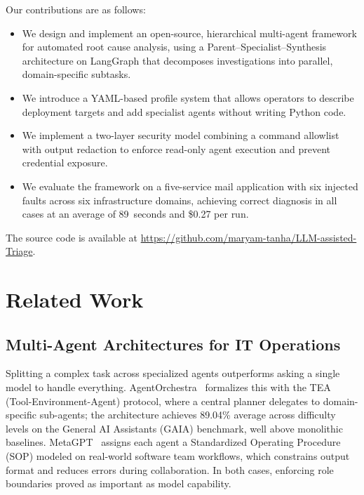 \documentclass[conference]{IEEEtran}
\begin{document}
Our contributions are as follows:
\begin{itemize}
  \item We design and implement an open-source, hierarchical
        multi-agent framework for automated root cause analysis,
        using a Parent--Specialist--Synthesis architecture on
        LangGraph that decomposes investigations into parallel,
        domain-specific subtasks.
  \item We introduce a YAML-based profile system that allows
        operators to describe deployment targets and add specialist
        agents without writing Python code.
  \item We implement a two-layer security model combining a command
        allowlist with output redaction to enforce read-only agent
        execution and prevent credential exposure.
  \item We evaluate the framework on a five-service mail application
        with six injected faults across six infrastructure domains,
        achieving correct diagnosis in all cases at an average of
        89~seconds and \$0.27 per run.
\end{itemize}
\begin{sloppypar}
The source code is available at \url{https://github.com/maryam-tanha/LLM-assisted-Triage}.
\end{sloppypar}

\section{Related Work}

\subsection{Multi-Agent Architectures for IT Operations}
Splitting a complex task across specialized agents outperforms asking a single
model to handle everything. AgentOrchestra~\cite{zhang2025agentorchestra} formalizes this
with the TEA (Tool-Environment-Agent) protocol, where a central planner delegates to
domain-specific sub-agents; the architecture achieves 89.04\% average across difficulty levels on the General AI Assistants (GAIA) benchmark, well above
monolithic baselines. MetaGPT~\cite{hong2024metagpt} assigns each
agent a Standardized Operating Procedure (SOP) modeled on real-world
software team workflows, which constrains output format and reduces
errors during collaboration. In both cases, enforcing role boundaries proved as important as
model capability.
\end{document}
